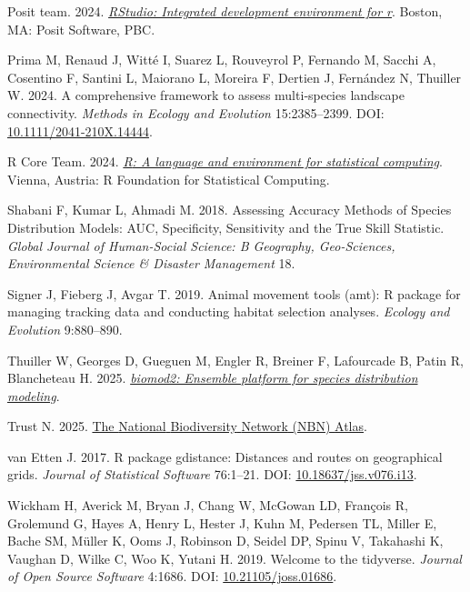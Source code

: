\documentclass[10pt,a4paper]{article}
\newlength{\cslhangindent}
\newenvironment{CSLReferences}[2] %
 {\begin{list}{}{%
  \setlength{\itemindent}{0pt}
  \setlength{\leftmargin}{0pt}
  \setlength{\parsep}{0pt}
  \ifodd #1
   \setlength{\leftmargin}{\cslhangindent}
   \setlength{\itemindent}{-1\cslhangindent}
  \fi
  \setlength{\itemsep}{#2\baselineskip}}}
 {\end{list}}
\begin{document}
\begin{CSLReferences}{1}{0}
Posit team. 2024. \emph{\href{http://www.posit.co/}{{RStudio}: Integrated development environment for r}}. Boston, MA: Posit Software, PBC.

Prima M, Renaud J, Witté I, Suarez L, Rouveyrol P, Fernando M, Sacchi A, Cosentino F, Santini L, Maiorano L, Moreira F, Dertien J, Fernández N, Thuiller W. 2024. A comprehensive framework to assess multi‐species landscape connectivity. \emph{Methods in Ecology and Evolution} 15:2385--2399. DOI: \href{https://doi.org/10.1111/2041-210X.14444}{10.1111/2041-210X.14444}.

R Core Team. 2024. \emph{\href{https://www.R-project.org/}{{R}: A language and environment for statistical computing}}. Vienna, Austria: R Foundation for Statistical Computing.

Shabani F, Kumar L, Ahmadi M. 2018. Assessing {Accuracy} {Methods} of {Species} {Distribution} {Models}: {AUC}, {Specificity}, {Sensitivity} and the {True} {Skill} {Statistic}. \emph{Global Journal of Human-Social Science: B Geography, Geo-Sciences, Environmental Science \& Disaster Management} 18.

Signer J, Fieberg J, Avgar T. 2019. Animal movement tools (amt): R package for managing tracking data and conducting habitat selection analyses. \emph{Ecology and Evolution} 9:880--890.

Thuiller W, Georges D, Gueguen M, Engler R, Breiner F, Lafourcade B, Patin R, Blancheteau H. 2025. \emph{\href{https://CRAN.R-project.org/package=biomod2}{biomod2: Ensemble platform for species distribution modeling}}.

Trust N. 2025. \href{https://ror.org/00mcxye41}{The {National} {Biodiversity} {Network} ({NBN}) {Atlas}}.

van Etten J. 2017. R package gdistance: Distances and routes on geographical grids. \emph{Journal of Statistical Software} 76:1--21. DOI: \href{https://doi.org/10.18637/jss.v076.i13}{10.18637/jss.v076.i13}.

Wickham H, Averick M, Bryan J, Chang W, McGowan LD, François R, Grolemund G, Hayes A, Henry L, Hester J, Kuhn M, Pedersen TL, Miller E, Bache SM, Müller K, Ooms J, Robinson D, Seidel DP, Spinu V, Takahashi K, Vaughan D, Wilke C, Woo K, Yutani H. 2019. Welcome to the {tidyverse}. \emph{Journal of Open Source Software} 4:1686. DOI: \href{https://doi.org/10.21105/joss.01686}{10.21105/joss.01686}.


\end{CSLReferences}
\end{document}
